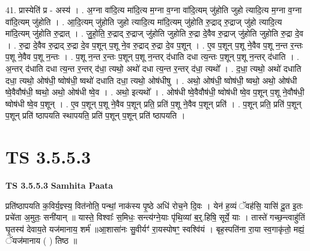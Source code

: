 \documentclass[17pt]{extarticle}
\begin{document}
41. प्रास्येति॑ प्र - अस्य॑ । . अ॒ग्ना वा॑दि॒त्य मा॑दि॒त्य म॒ग्ना व॒ग्ना वा॑दि॒त्यम् जु॑होति जुहो त्यादि॒त्य म॒ग्ना व॒ग्ना वा॑दि॒त्यम् जु॑होति । . आ॒दि॒त्यम् जु॑होति जुहो त्यादि॒त्य मा॑दि॒त्यम् जु॑होति रु॒द्राद् रु॒द्राज् जु॑हो त्यादि॒त्य मा॑दि॒त्यम् जु॑होति रु॒द्रात् । . जु॒हो॒ति॒ रु॒द्राद् रु॒द्राज् जु॑होति जुहोति रु॒द्रा दे॒वैव रु॒द्राज् जु॑होति जुहोति रु॒द्रा दे॒व । . रु॒द्रा दे॒वैव रु॒द्राद् रु॒द्रा दे॒व प॒शून् प॒शू ने॒व रु॒द्राद् रु॒द्रा दे॒व प॒शून् । . ए॒व प॒शून् प॒शू ने॒वैव प॒शू न॒न्त र॒न्तः प॒शू ने॒वैव प॒शू न॒न्तः । . प॒शू न॒न्त र॒न्तः प॒शून् प॒शू न॒न्तर् द॑धाति दधा त्य॒न्तः प॒शून् प॒शू न॒न्तर् द॑धाति । . अ॒न्तर् द॑धाति दधा त्य॒न्त र॒न्तर् द॑धा॒ त्यथो॒ अथो॑ दधा त्य॒न्त र॒न्तर् द॑धा॒ त्यथो᳚ । . द॒धा॒ त्यथो॒ अथो॑ दधाति दधा॒ त्यथो॒ ओष॑धी॒ ष्वोष॑धी॒ ष्वथो॑ दधाति दधा॒ त्यथो॒ ओष॑धीषु । . अथो॒ ओष॑धी॒ ष्वोष॑धी॒ ष्वथो॒ अथो॒ ओष॑धी ष्वे॒वैवौष॑धी॒ ष्वथो॒ अथो॒ ओष॑धी ष्वे॒व । . अथो॒ इत्यथो᳚ । . ओष॑धी ष्वे॒वैवौष॑धी॒ ष्वोष॑धी ष्वे॒व प॒शून् प॒शू ने॒वौष॑धी॒ ष्वोष॑धी ष्वे॒व प॒शून् । . ए॒व प॒शून् प॒शू ने॒वैव प॒शून् प्रति॒ प्रति॑ प॒शू ने॒वैव प॒शून् प्रति॑ । . प॒शून् प्रति॒ प्रति॑ प॒शून् प॒शून् प्रति॑ ष्ठापयति स्थापयति॒ प्रति॑ प॒शून् प॒शून् प्रति॑ ष्ठापयति । \newline
\pagebreak
{}

\section{ TS 3.5.5.3 }

\textbf{TS 3.5.5.3 } \newline
\textbf{Samhita Paata} \newline

प्रति॑ष्ठापयति क॒विर्य॒ज्ञ्स्य॒ वित॑नोति॒ पन्थां॒ नाक॑स्य पृ॒ष्ठे अधि॑ रोच॒ने दि॒वः । येन॑ ह॒व्यं ॅवह॑सि॒ यासि॑ दू॒त इ॒तः प्रचे॑ता अ॒मुतः॒ सनी॑यान् ॥ यास्ते॒ विश्वाः᳚ स॒मिधः॒ सन्त्य॑ग्ने॒याः पृ॑थि॒व्यां ब॒र्॒.हिषि॒ सूर्ये॒ याः । तास्ते॑ गच्छ॒न्त्वाहु॑तिं घृ॒तस्य॑ देवाय॒ते यज॑मानाय॒ शर्म॑ ॥आ॒शासा॑नः सु॒वीर्यꣳ॑ रा॒यस्पोषꣳ॒॒ स्वश्वि॑यं । बृह॒स्पति॑ना रा॒या स्व॒गाकृ॑तो॒ मह्यं॒ ॅयज॑मानाय ( ) तिष्ठ ॥ \newline
\end{document}

